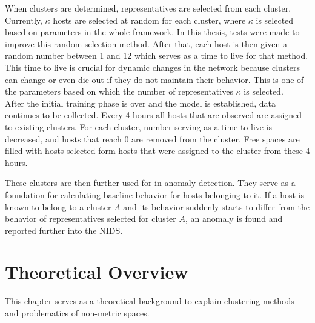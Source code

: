 \documentclass[thesis=B,english]{FITthesis}[2012/10/20]
\begin{document}
When clusters are determined, representatives are selected from each cluster.
Currently, $\kappa$ hosts are selected at random for each cluster, where $\kappa$ is selected based on parameters in the whole framework.                       
In this thesis, tests were made to improve this random selection method.
After that, each host is then given a random number between 1 and 12 which serves as a time to live for that method. 
This time to live is crucial for dynamic changes in the network because clusters can change or even die out if they do not maintain their behavior.
This is one of the parameters based on which the number of representatives $\kappa$ is selected. \\
                                                                                  
After the initial training phase is over and the model is established, data continues to be collected.
Every 4 hours all hosts that are observed are assigned to existing clusters.
For each cluster, number serving as a time to live is decreased, and hosts that reach 0 are removed from the cluster.
Free spaces are filled with hosts selected form hosts that were assigned to the cluster from these 4 hours.

These clusters are then further used for in anomaly detection.                    
They serve as a foundation for calculating baseline behavior for hosts belonging to it.
If a host is known to belong to a cluster $A$ and its behavior suddenly starts to differ from the behavior of representatives selected for cluster $A$, an anomaly is found and reported further into the NIDS.


\chapter{Theoretical Overview}

This chapter serves as a theoretical background to explain clustering methods and problematics of non-metric spaces.
                                                                                  
\end{document}
